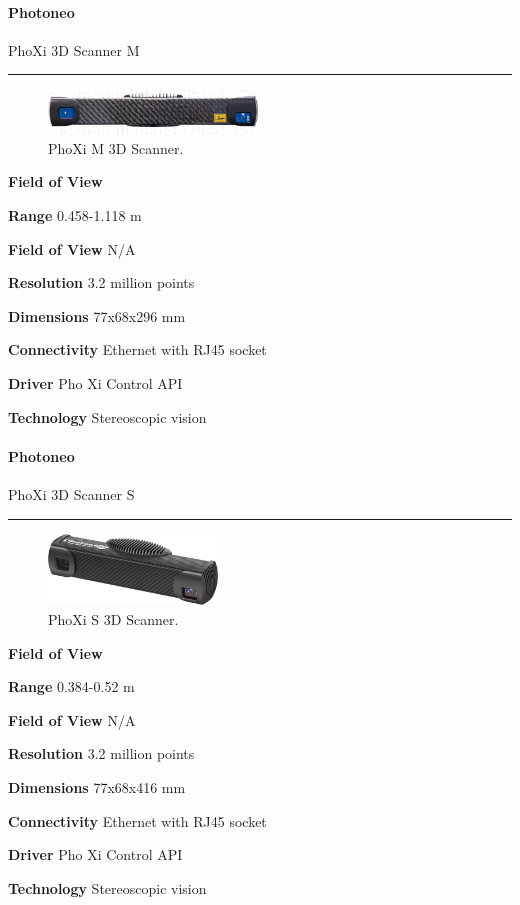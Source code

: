 \documentclass[../main.tex]{subfiles}
\begin{document}
\paragraph{\large \textbf{Photoneo}} {\large PhoXi 3D Scanner M}

\noindent\rule{8cm}{0.1pt}
\begin{figure}[H]
    \centering
    \includegraphics[width=0.5\textwidth]{images/phoXiM.png}
    \caption{PhoXi M 3D Scanner.}
    \label{fig:phoXiM}
\end{figure}
\begin{labeling}{\textbf{Field of View    }}
    \setlength{\itemindent}{2em}
    \item [\textbf{Range}] 0.458-1.118 m
    \item [\textbf{Field of View}] N/A
    \item [\textbf{Resolution}] 3.2 million points
    \item [\textbf{Dimensions}] 77x68x296 mm
    \item [\textbf{Connectivity}] Ethernet with RJ45 socket
    \item [\textbf{Driver}] Pho Xi Control API
    \item [\textbf{Technology}] Stereoscopic vision
\end{labeling}
\vspace{1em}
\paragraph{\large \textbf{Photoneo}} {\large PhoXi 3D Scanner S}

\noindent\rule{8cm}{0.1pt}
\begin{figure}[H]
    \centering
    \includegraphics[width=0.4\textwidth]{images/phoXiS.png}
    \caption{PhoXi S 3D Scanner.}
    \label{fig:phoXiS}
\end{figure}
\begin{labeling}{\textbf{Field of View    }}
    \setlength{\itemindent}{2em}
    \item [\textbf{Range}] 0.384-0.52 m
    \item [\textbf{Field of View}] N/A
    \item [\textbf{Resolution}] 3.2 million points
    \item [\textbf{Dimensions}] 77x68x416 mm
    \item [\textbf{Connectivity}] Ethernet with RJ45 socket
    \item [\textbf{Driver}] Pho Xi Control API
    \item [\textbf{Technology}] Stereoscopic vision
\end{labeling}
\vspace{1em}
\end{document}

